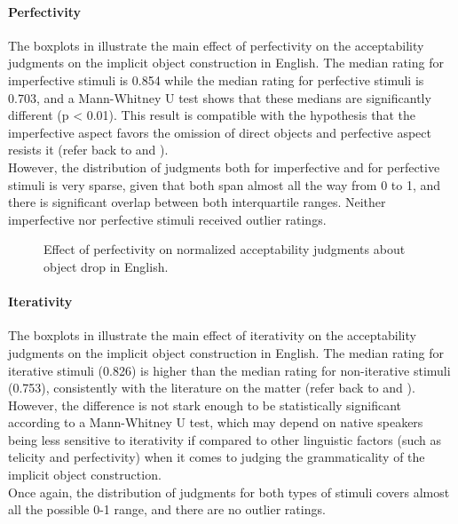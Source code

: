 \paragraph{Perfectivity}
The boxplots in  illustrate the main effect of perfectivity on the acceptability judgments on the implicit object construction in English. The median rating for imperfective stimuli is 0.854 while the median rating for perfective stimuli is 0.703, and a Mann-Whitney U test shows that these medians are significantly different (p < 0.01). This result is compatible with the hypothesis that the imperfective aspect favors the omission of direct objects and perfective aspect resists it (refer back to  and ).\\
However, the distribution of judgments both for imperfective and for perfective stimuli is very sparse, given that both span almost all the way from 0 to 1, and there is significant overlap between both interquartile ranges. Neither imperfective nor perfective stimuli received outlier ratings.

\begin{figure}[htb]
\caption{Effect of perfectivity on normalized acceptability judgments about object drop in English.}
    
\end{figure}

\paragraph{Iterativity}
The boxplots in  illustrate the main effect of iterativity on the acceptability judgments on the implicit object construction in English. The median rating for iterative stimuli (0.826) is higher than the median rating for non-iterative stimuli (0.753), consistently with the literature on the matter (refer back to  and ). However, the difference is not stark enough to be statistically significant according to a Mann-Whitney U test, which may depend on native speakers being less sensitive to iterativity if compared to other linguistic factors (such as telicity and perfectivity) when it comes to judging the grammaticality of the implicit object construction.\\
Once again, the distribution of judgments for both types of stimuli covers almost all the possible 0-1 range, and there are no outlier ratings.

